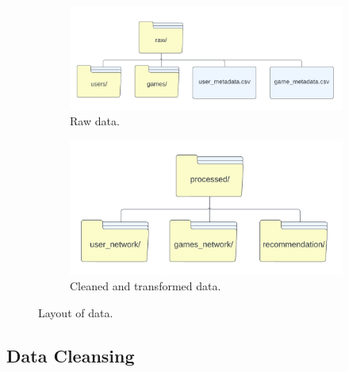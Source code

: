 \vspace{-10pt}
\begin{figure}[h]
  \centering
  \begin{subfigure}{0.5\linewidth}
    \centering
    \includegraphics[width=\linewidth]{images/data-collection.png}
    \caption{Raw data.}
    \label{fig:figure1}
  \end{subfigure}
  \hspace{0.05\linewidth}
  \begin{subfigure}{0.4\linewidth}
    \centering
    \includegraphics[width=\linewidth]{images/data-cleaning-transformation.png}
    \caption{Cleaned and transformed data.}
    \label{fig:figure2}
  \end{subfigure}
  \caption{Layout of data.}
  \label{fig:figures}
\end{figure}
\vspace{-20pt}

\subsection{Data Cleansing}

